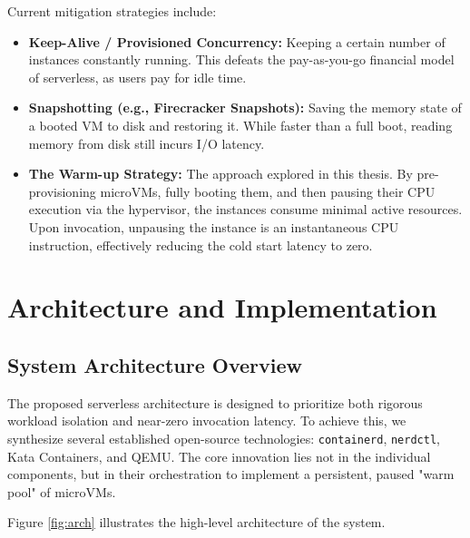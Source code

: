 \documentclass[12pt,a4paper]{report}
\begin{document}
Current mitigation strategies include:
\begin{itemize}
    \item \textbf{Keep-Alive / Provisioned Concurrency:} Keeping a certain number of instances constantly running. This defeats the pay-as-you-go financial model of serverless, as users pay for idle time.
    \item \textbf{Snapshotting (e.g., Firecracker Snapshots):} Saving the memory state of a booted VM to disk and restoring it. While faster than a full boot, reading memory from disk still incurs I/O latency.
    \item \textbf{The Warm-up Strategy:} The approach explored in this thesis. By pre-provisioning microVMs, fully booting them, and then pausing their CPU execution via the hypervisor, the instances consume minimal active resources. Upon invocation, unpausing the instance is an instantaneous CPU instruction, effectively reducing the cold start latency to zero.
\end{itemize}

\vspace{2cm}
\lipsum[21-40]

\clearpage{}
\clearpage{}\chapter{Architecture and Implementation}

\section{System Architecture Overview}
The proposed serverless architecture is designed to prioritize both rigorous workload isolation and near-zero invocation latency. To achieve this, we synthesize several established open-source technologies: \texttt{containerd}, \texttt{nerdctl}, Kata Containers, and QEMU. The core innovation lies not in the individual components, but in their orchestration to implement a persistent, paused "warm pool" of microVMs.

Figure \ref{fig:arch} illustrates the high-level architecture of the system.
\end{document}
